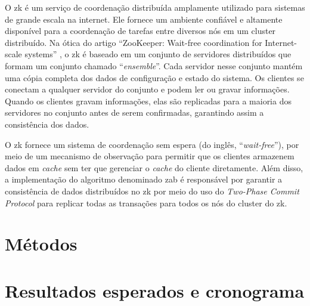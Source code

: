 O \gls{zk} \cite{ZookeeperGitHub} é um serviço de coordenação distribuída amplamente utilizado para sistemas de grande escala na internet. Ele fornece um ambiente confiável e altamente disponível para a coordenação de tarefas entre diversos nós em um cluster distribuído. Na ótica do artigo ``ZooKeeper: Wait-free coordination for Internet-scale systems'' \cite{ZooKeeperWaitFree:2010}, o \gls{zk} é baseado em um conjunto de servidores distribuídos que formam um conjunto chamado ``\textit{ensemble}''. Cada servidor nesse conjunto mantém uma cópia completa dos dados de configuração e estado do sistema. Os clientes se conectam a qualquer servidor do conjunto e podem ler ou gravar informações. Quando os clientes gravam informações, elas são replicadas para a maioria dos servidores no conjunto antes de serem confirmadas, garantindo assim a consistência dos dados. 

O \gls{zk} fornece um sistema de coordenação sem espera (do inglês, ``\textit{wait-free}''), por meio de um mecanismo de observação para permitir que os clientes armazenem dados em \textit{cache} sem ter que gerenciar o \textit{cache} do cliente diretamente. Além disso, a implementação do algoritmo denominado \gls{zab} é responsável por garantir a consistência de dados distribuídos no \gls{zk} por meio do uso do \textit{Two-Phase Commit Protocol} para replicar todas as transações para todos os nós do cluster do \gls{zk}\cite{CloudKarafkaZAB}.

\section{Métodos}\label{sec:metodo}

\section{Resultados esperados e cronograma}

